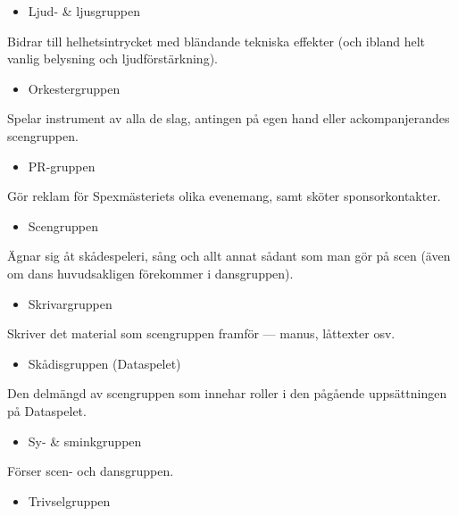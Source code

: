 \documentclass[a4paper,12pt]{article}
\begin{document}
\begin{itemize}
  \item Ljud- \& ljusgruppen
\end{itemize}

Bidrar till helhetsintrycket med bländande tekniska effekter (och ibland helt vanlig belysning och ljudförstärkning).

\begin{itemize}
  \item Orkestergruppen
\end{itemize}

Spelar instrument av alla de slag, antingen på egen hand eller ackompanjerandes scengruppen.

\begin{itemize}
  \item PR-gruppen
\end{itemize}

Gör reklam för Spexmästeriets olika evenemang, samt sköter sponsorkontakter.

\begin{itemize}
  \item Scengruppen
\end{itemize}

Ägnar sig åt skådespeleri, sång och allt annat sådant som man gör på scen (även om dans huvudsakligen förekommer i dansgruppen).

\begin{itemize}
  \item Skrivargruppen
\end{itemize}

Skriver det material som scengruppen framför --- manus, låttexter osv.

\begin{itemize}
  \item Skådisgruppen (Dataspelet)
\end{itemize}

Den delmängd av scengruppen som innehar roller i den pågående uppsättningen på Dataspelet.

\begin{itemize}
  \item Sy- \& sminkgruppen
\end{itemize}

Förser scen- och dansgruppen.

\begin{itemize}
  \item Trivselgruppen
\end{itemize}
\end{document}
